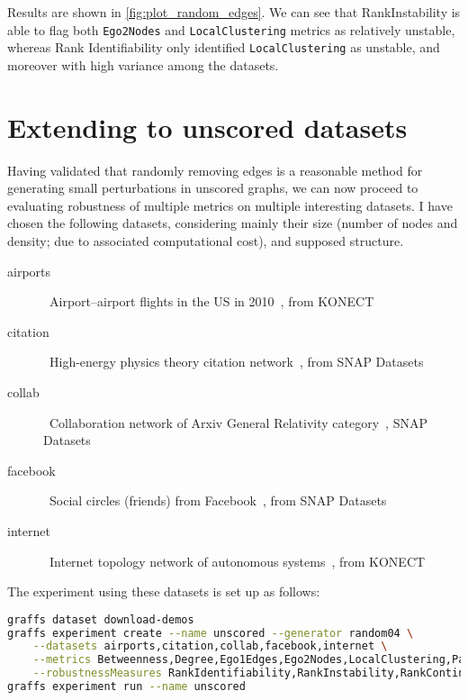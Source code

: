 Results are shown in \autoref{fig:plot_random_edges}.
We can see that RankInstability is able to flag both \texttt{Ego2Nodes} and \texttt{LocalClustering} metrics as relatively unstable, whereas Rank Identifiability only identified \texttt{LocalClustering} as unstable, and moreover with high variance among the datasets.


\section{Extending to unscored datasets}

Having validated that randomly removing edges is a reasonable method for generating small perturbations in unscored graphs, we can now proceed to evaluating robustness of multiple metrics on multiple interesting datasets.
I have chosen the following datasets, considering mainly their size (number of nodes and density; due to associated computational cost), and supposed structure.

\begin{description}
    \item[airports]\ Airport–airport flights in the US in 2010~\cite{konect:2016:opsahl-usairport,konect:opsahl11}, from KONECT~\cite{Kunegis2013}
    \item[citation]\ High-energy physics theory citation network~\cite{LeskovecGraphsTimeDensification2005,GehrkeOverview2003KDD2003}, from SNAP Datasets~\cite{Large2016}
    \item[collab]\ Collaboration network of Arxiv General Relativity category~\cite{LeskovecGraphEvolutionDensification2007}, SNAP Datasets
    \item[facebook]\ Social circles (friends) from Facebook~\cite{NIPS2012_4532}, from SNAP Datasets
    \item[internet]\ Internet topology network of autonomous systems~\cite{konect:zhang05,konect:2016:topology}, from KONECT
\end{description}



The experiment using these datasets is set up as follows:
\begin{lstlisting}[language=bash]
graffs dataset download-demos
graffs experiment create --name unscored --generator random04 \
    --datasets airports,citation,collab,facebook,internet \
    --metrics Betweenness,Degree,Ego1Edges,Ego2Nodes,LocalClustering,PageRank,Redundancy \
    --robustnessMeasures RankIdentifiability,RankInstability,RankContinuity
graffs experiment run --name unscored
\end{lstlisting}

